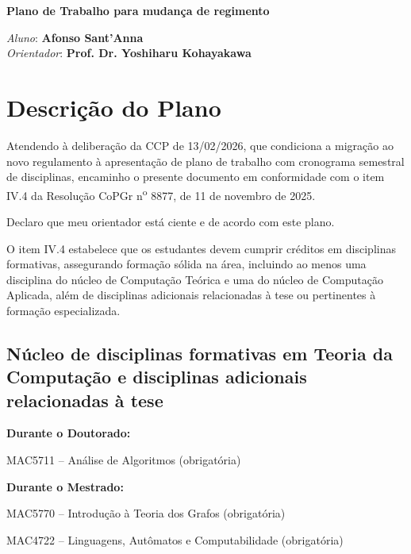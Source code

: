 \documentclass[reqno, 12pt]{amsart}
\date{}
\newenvironment{packed_itemize}{
\begin{itemize}
  \setlength{\itemsep}{2pt}
  \setlength{\parskip}{0pt}
  \setlength{\parsep}{0pt}
}{\end{itemize}}
\begin{document}
\begin{center}
\vspace{.2cm}
\textbf{\Large Plano de Trabalho para mudança de regimento}\\
\vspace{.4cm}
\end{center}

\noindent \textit{Aluno}: {\bf Afonso Sant'Anna}\\
\noindent \textit{Orientador}: \textbf{Prof. Dr. Yoshiharu Kohayakawa}

\section{Descrição do Plano}

Atendendo à deliberação da CCP de 13/02/2026, que condiciona a migração ao novo regulamento à apresentação de plano de trabalho com cronograma semestral de disciplinas, encaminho o presente documento em conformidade com o item IV.4 da Resolução CoPGr n\textsuperscript{o} 8877, de 11 de novembro de 2025.

Declaro que meu orientador está ciente e de acordo com este plano.

O item IV.4 estabelece que os estudantes devem cumprir créditos em disciplinas formativas, assegurando formação sólida na área, incluindo ao menos uma disciplina do núcleo de Computação Teórica e uma do núcleo de Computação Aplicada, além de disciplinas adicionais relacionadas à tese ou pertinentes à formação especializada.

\subsection{ Núcleo de disciplinas formativas em Teoria da Computação e disciplinas adicionais relacionadas à tese}

\textbf{Durante o Doutorado:}
\begin{packed_itemize}
  \item MAC5711 -- Análise de Algoritmos (obrigatória)
\end{packed_itemize}

\textbf{Durante o Mestrado:}
\begin{packed_itemize}
  \item MAC5770 -- Introdução à Teoria dos Grafos (obrigatória)
  \item MAC4722 -- Linguagens, Autômatos e Computabilidade (obrigatória)
\end{packed_itemize}
\end{document}
